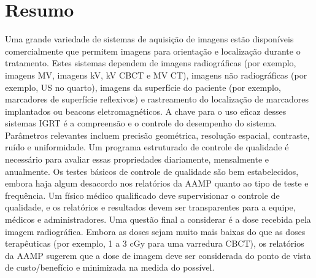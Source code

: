 \documentclass[11pt,a4paper]{article}
\newcounter{exemplo}
\begin{document}
\section{Resumo}

    Uma grande variedade de sistemas de aquisição de imagens estão disponíveis comercialmente que permitem imagens para orientação e localização durante o tratamento. Estes sistemas dependem de imagens radiográficas (por exemplo, imagens MV, imagens kV, kV CBCT e MV CT), imagens não radiográficas (por exemplo, US no quarto), imagens da superfície do paciente (por exemplo, marcadores de superfície reflexivos) e rastreamento do localização de marcadores implantados ou beacons eletromagnéticos. A chave para o uso eficaz desses sistemas IGRT é a compreensão e o controle do desempenho do sistema. Parâmetros relevantes incluem precisão geométrica, resolução espacial, contraste, ruído e uniformidade. Um programa estruturado de controle de qualidade é necessário para avaliar essas propriedades diariamente, mensalmente e anualmente. Os testes básicos de controle de qualidade são bem estabelecidos, embora haja algum desacordo nos relatórios da AAMP quanto ao tipo de teste e frequência. Um físico médico qualificado deve supervisionar o controle de qualidade, e os relatórios e resultados devem ser transparentes para a equipe, médicos e administradores. Uma questão final a considerar é a dose recebida pela imagem radiográfica. Embora as doses sejam muito mais baixas do que as doses terapêuticas (por exemplo, 1 a 3 cGy para uma varredura CBCT), os relatórios da AAMP sugerem que a dose de imagem deve ser considerada do ponto de vista de custo/benefício e minimizada na medida do possível.


\end{document}
